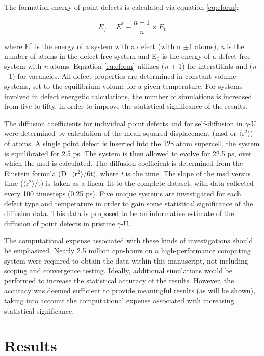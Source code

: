 \documentclass[review]{elsarticle}
\begin{document}
The formation energy of point defects is calculated via equation \ref{eq:eform}: 

\begin{equation}
\label{eq:eform}
E_f = E^* - \frac{n \pm 1}{n} \times E_0
\end{equation}

where E$^{*}$ is the energy of a system with a defect (with n $\pm 1$ atoms), \textit{n} is the number of atoms in the defect-free system and E$_{0}$ is the energy of a defect-free system with \textit{n} atoms. Equation \ref{eq:eform} utilizes (\textit{n} + 1) for interstitials and (\textit{n} - 1) for vacancies. All defect properties are determined in constant volume systems, set to the equilibrium volume for a given temperature. For systems involved in defect energetic calculations, the number of simulations is increased from five to fifty, in order to improve the statistical significance of the results.

The diffusion coefficients for individual point defects and for self-diffusion in $\gamma$-U were determined by calculation of the mean-squared displacement (msd or $\langle$r$^2$$\rangle$) of atoms. A single point defect is inserted into the 128 atom supercell, the system is equilibrated for 2.5 ps. The system is then allowed to evolve for 22.5 ps, over which the msd is calculated. The diffusion coefficient is determined from the Einstein formula (D=$\langle$r$^2$$\rangle$/6t), where \textit{t} is the time. The slope of the msd versus time ($\langle$r$^2$$\rangle$/t) is taken as a linear fit to the complete dataset, with data collected every 100 timesteps (0.25 ps). Five unique systems are investigated for each defect type and temperature in order to gain some statistical significance of the diffusion data. This data is proposed to be an informative estimate of the diffusion of point defects in pristine $\gamma$-U. 

The computational expense associated with these kinds of investigations should be emphasized. Nearly 2.5 million cpu-hours on a high-performance computing system were required to obtain the data within this manuscript, not including scoping and convergence testing. Ideally, additional simulations would be performed to increase the statistical accuracy of the results. However, the accuracy was deemed sufficient to provide meaningful results (as will be shown), taking into account the computational expense associated with increasing statistical significance. 

\section{Results}
\end{document}
